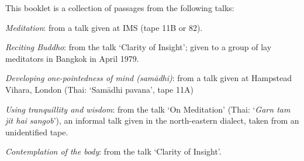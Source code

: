 
{\setlength{\parindent}{0pt}\setlength{\parskip}{0.5\baselineskip}

This booklet is a collection of passages from the following talks:

\textit{Meditation}: from a talk given at IMS (tape 11B or 82).

\textit{Reciting Buddho}: from the talk `Clarity of Insight'; given to a group of lay meditators in Bangkok in April 1979.

\textit{Developing one-pointedness of mind (sam\=adhi)}: from a talk given at Hampstead Vihara, London (Thai: `Sam\=adhi pavana', tape 11A)

\textit{Using tranquillity and wisdom}: from the talk `On Meditation' (Thai: `\textit{Garn tam jit hai sangob}'), an informal talk given in the north-eastern dialect, taken from an unidentified tape.

\textit{Contemplation of the body}: from the talk `Clarity of Insight'.

}